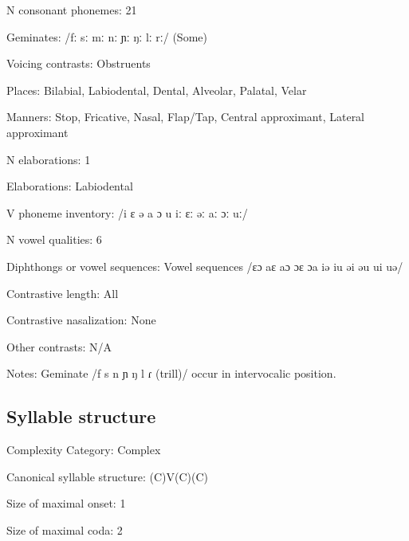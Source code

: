 {\begin{appendixdesc}
\item[N consonant phonemes:] 21

\item[Geminates:] /fː sː mː nː ɲː ŋː lː rː/ (Some)

\item[Voicing contrasts:] Obstruents

\item[Places:] Bilabial, Labiodental, Dental, Alveolar, Palatal, Velar

\item[Manners:] Stop, Fricative, Nasal, Flap/Tap, Central approximant, Lateral approximant

\item[N elaborations:] 1

\item[Elaborations:] Labiodental

\item[V phoneme inventory:] /i ɛ ə a ɔ u iː ɛː əː aː ɔː uː/

\item[N vowel qualities:] 6

\item[Diphthongs or vowel sequences:] Vowel sequences /ɛɔ aɛ aɔ ɔɛ ɔa iə iu əi əu ui uə/

\item[Contrastive length:] All

\item[Contrastive nasalization:] None

\item[Other contrasts:] N/A

\item[Notes:] Geminate /f s n ɲ ŋ l ɾ (trill)/ occur in intervocalic position.
\end{appendixdesc}
\subsection*{Syllable structure}
\begin{appendixdesc}

\item[Complexity Category:] Complex

\item[Canonical syllable structure:] (C)V(C)(C) \citep[36--43]{Stirtz2011}

\item[Size of maximal onset:] 1

\item[Size of maximal coda:] 2


\end{appendixdesc}}
